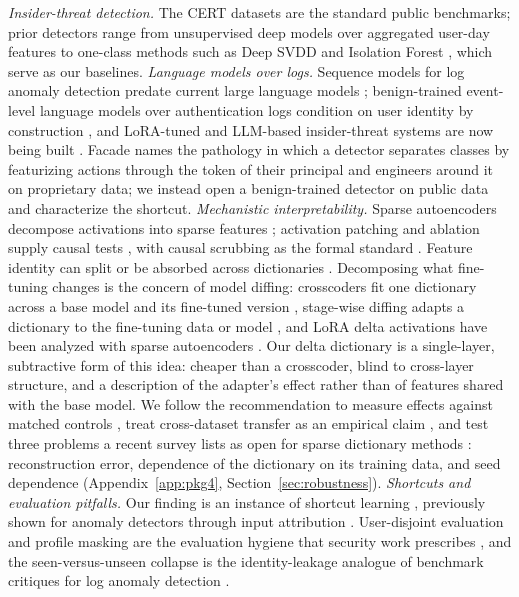 \documentclass[10pt]{article} %
\begin{document}
\emph{Insider-threat detection.} The CERT datasets
\citep{glasser2013bridging,certdataset} are the standard public benchmarks;
prior detectors range from unsupervised deep models over aggregated user-day
features \citep{tuor2017deep,le2020analyzing,yuan2021deep} to one-class
methods such as Deep SVDD \citep{ruff2018deepsvdd} and Isolation Forest
\citep{liu2008isolation}, which serve as our baselines.
\emph{Language models over logs.} Sequence models for log anomaly detection
predate current large language models \citep{du2017deeplog,guo2021logbert};
benign-trained event-level language models over authentication logs
condition on user identity by construction \citep{tuor2018recurrent}, and
LoRA-tuned and LLM-based insider-threat systems are now being built
\citep{song2025dmfi,sun2025redchronos}. Facade \citep{kantchelian2024facade}
names the pathology in which a detector separates classes by featurizing
actions through the token of their principal and engineers around it on
proprietary data; we instead open a benign-trained detector on public data
and characterize the shortcut.
\emph{Mechanistic interpretability.} Sparse autoencoders decompose
activations into sparse features
\citep{cunningham2023sparse,bricken2023monosemanticity,gao2024scaling};
activation patching and ablation supply causal tests
\citep{vig2020investigating,meng2022locating,zhang2023best,heimersheim2024use},
with causal scrubbing as the formal standard \citep{chan2022causal}. Feature
identity can split or be absorbed across dictionaries
\citep{chanin2024absorption}. Decomposing what fine-tuning changes is the
concern of model diffing: crosscoders fit one dictionary across a base model
and its fine-tuned version \citep{lindsey2024crosscoders}, stage-wise diffing
adapts a dictionary to the fine-tuning data or model
\citep{bricken2024stagewise}, and LoRA delta activations have been analyzed
with sparse autoencoders \citep{prasanth2026lora}. Our delta dictionary is a
single-layer, subtractive form of this idea: cheaper than a crosscoder, blind
to cross-layer structure, and a description of the adapter's effect rather
than of features shared with the base model. We follow the recommendation to
measure effects against matched controls \citep{zhang2023best}, treat
cross-dataset transfer as an empirical claim \citep{olah2020zoom,chughtai2023toy},
and test three problems a recent survey lists as open for sparse dictionary
methods \citep{sharkey2025open}: reconstruction error, dependence of the
dictionary on its training data, and seed dependence
(Appendix~\ref{app:pkg4}, Section~\ref{sec:robustness}).
\emph{Shortcuts and evaluation pitfalls.} Our finding is an instance of
shortcut learning
\citep{geirhos2020shortcut,lapuschkin2019unmasking,damour2020underspecification},
previously shown for anomaly detectors through input attribution
\citep{kauffmann2020clever}. User-disjoint evaluation and profile masking are
the evaluation hygiene that security work prescribes \citep{arp2022dos}, and
the seen-versus-unseen collapse is the identity-leakage analogue of benchmark
critiques for log anomaly detection \citep{landauer2024critical}.
\end{document}
